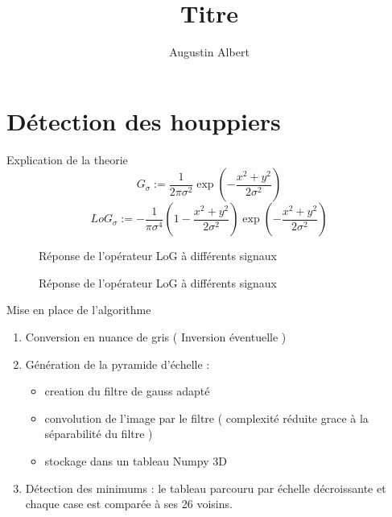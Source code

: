 \documentclass{beamer}
\title{Titre}
\author{Augustin Albert}
\begin{document}
\begin{frame}
	\titlepage
\end{frame}
\begin{frame}
	\tableofcontents
\end{frame}

\section{Détection des houppiers}

\begin{frame}
	Explication de la theorie
	\[G_{\sigma}:=\frac{1}{2\pi\sigma^{2}}\exp(-\frac{x^{2}+y^{2}}{2\sigma^{2}})\]
	\[{LoG}_{\sigma}:=-\frac{1}{\pi\sigma^{4}}(1-\frac{x^{2}+y^{2}}{2\sigma^{2}})\exp(-\frac{x^{2}+y^{2}}{2\sigma^{2}})\] 
\end{frame}

\begin{frame}
	\begin{figure}
		\subfloat[Réponse à un créneau pour $\sigma=1$, $\sigma=2$ et $\sigma=3$ \label{fig:b}]{\scalebox{0.3}{}}
		\caption{Réponse de l'opérateur LoG à différents signaux}
	\end{figure}
\end{frame}
\begin{frame}
	\begin{figure}
		\subfloat[Réponses à des créneaux pour $\sigma=1$\label{fig:c}]{\scalebox{0.3}{}}
		\caption{Réponse de l'opérateur LoG à différents signaux}
	\end{figure}
\end{frame}

\begin{frame}
	Mise en place de l'algorithme
	\begin{enumerate}
		\item Conversion en nuance de gris ( Inversion éventuelle ) 
		\item Génération de la pyramide d'échelle : 
		\begin{itemize}
			\item creation du filtre de gauss adapté
			\item convolution de l'image par le filtre ( complexité réduite grace à la séparabilité du filtre )
			\item stockage dans un tableau Numpy 3D
		\end{itemize}
		\item Détection des minimums : le tableau parcouru par échelle décroissante et chaque case est comparée à ses 26 voisins.
	\end{enumerate}	
\end{frame}
\end{document}
